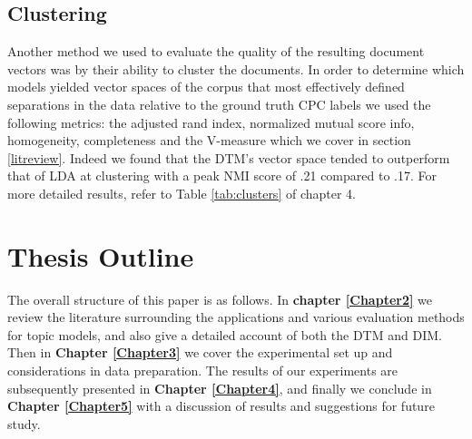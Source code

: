 

\subsection{Clustering}
Another method we used to evaluate the quality of the resulting document vectors was by their ability to cluster the documents. In order to determine which models yielded vector spaces of the corpus that most effectively defined separations in the data relative to the ground truth CPC labels we used the following metrics: the adjusted rand index, normalized mutual score info, homogeneity, completeness and the V-measure which we cover in section \ref{litreview}. Indeed we found that the DTM's vector space tended to outperform that of LDA at clustering with a peak NMI score of .21 compared to .17. For more detailed results, refer to Table \ref{tab:clusters} of chapter 4. 


 


\section{Thesis Outline}
The overall structure of this paper is as follows. In \textbf{chapter \ref{Chapter2}} we review the literature surrounding the applications and various evaluation methods for topic models,  and also give a detailed account of both the DTM and DIM.
Then in \textbf{Chapter \ref{Chapter3}} we cover the experimental set up and considerations in data preparation. The results of our experiments are subsequently presented in \textbf{Chapter \ref{Chapter4}}, and finally we conclude in \textbf{Chapter \ref{Chapter5}} with a discussion of results and suggestions for future study.




